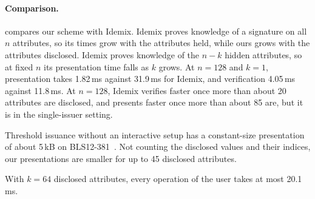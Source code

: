 \paragraph{Comparison.}  compares our scheme with Idemix. Idemix proves
knowledge of a signature on all $n$ attributes, so its times grow with the
attributes held, while ours grows with the attributes disclosed. Idemix proves
knowledge of the $n - k$ hidden attributes, so at fixed $n$ its presentation
time falls as $k$ grows. At $n = 128$
and $k = 1$, presentation takes 1.82\,ms against 31.9\,ms for Idemix, and
verification 4.05\,ms against 11.8\,ms. At $n = 128$, Idemix verifies faster
once more than about 20 attributes are disclosed, and presents faster once more
than about 85 are, but it is in the single-issuer setting.

Threshold issuance without an interactive setup has a constant-size presentation of about
5\,kB on BLS12-381~\cite{EPRINT:GGPR25}. Not counting the disclosed values and
their indices, our presentations are smaller for up to 45 disclosed
attributes.

With $k = 64$ disclosed attributes, every operation of the user takes at most
20.1\,ms.
